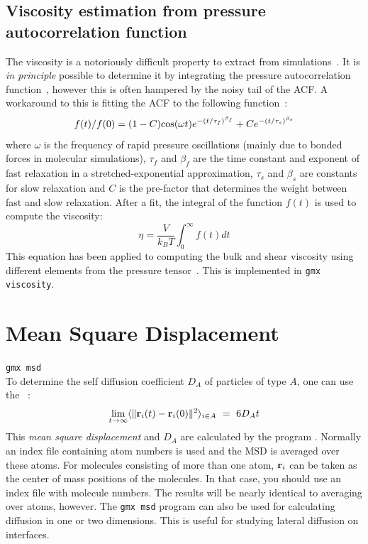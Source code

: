 \subsection{Viscosity estimation from pressure autocorrelation
  function}
The viscosity is a notoriously difficult property to extract from
simulations~\cite{Hess2002a,Wensink2003a}. It is {\em in principle}
possible to determine it by integrating the pressure autocorrelation
function~\cite{PSmith93c}, however this is often hampered by the noisy
tail of the ACF. A workaround to this is fitting the ACF to the
following function~\cite{Guo2002b}:
\begin{equation}
f(t)/f(0) = (1-C) {\rm cos}(\omega t) e^{-(t/\tau_f)^{\beta_f}} + C
e^{-(t/\tau_s)^{\beta_s}}
\end{equation}
where $\omega$ is the frequency of rapid pressure oscillations (mainly
due to bonded forces in molecular simulations), $\tau_f$ and $\beta_f$
are the time constant and exponent of fast relaxation in a
stretched-exponential approximation, $\tau_s$ and $\beta_s$ are constants
for slow relaxation and $C$ is the pre-factor that determines the
weight between fast and slow relaxation. After a fit, the integral of
the function $f(t)$ is used to compute the viscosity:
\begin{equation}
\eta = \frac{V}{k_B T}\int_0^{\infty} f(t) dt
\end{equation}
This equation has been
applied to computing the bulk and shear viscosity using different
elements from the pressure tensor~\cite{Fanourgakis2012a}.
This is implemented in {\tt gmx viscosity}.

\section{Mean Square Displacement}
\label{sec:msd}
{\tt gmx msd}\\
To determine the self diffusion coefficient $D_A$ 
of
particles of type $A$, one can use the ~\cite{Allen87}:
\begin{equation} 
\lim_{t \rightarrow \infty} \langle
\|{\bf r}_i(t) - {\bf r}_i(0)\|^2 \rangle_{i \in A} ~=~ 6 D_A t 
\end{equation}
This {\em mean square displacement} and $D_A$ are calculated by the
program {\tt {}}. Normally an index file containing
atom numbers is used and the MSD is averaged over these atoms.  For
molecules consisting of more than one atom, ${\bf r}_i$ can be taken
as the center of mass positions of the molecules. In that case, you
should use an index file with molecule numbers. The results will be
nearly identical to averaging over atoms, however. The {\tt gmx msd}
program can
also be used for calculating diffusion in one or two dimensions. This
is useful for studying lateral diffusion on interfaces.

